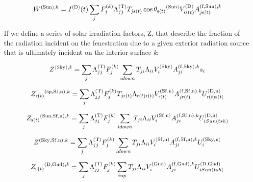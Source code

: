 \begin{equation}
{W^{{\rm{(Sun)}},k}} = {I^{{\rm{(D)}}}}(t)\sum\limits_j {F_j^{{\rm{(}}k{\rm{)}}}\Lambda_{jj}^{{\rm{(T)}}}{T_{j{\rm{ s}}(t)}}\cos {\theta_{{\rm{s(}}t{\rm{)}}}}^{{\rm{(Sun)}}}V_{i{\rm{ s(}}t{\rm{)}}}^{{\rm{(D)}}}A_{j{\rm{ s(}}t{\rm{)}}}^{{\rm{(f, Sun), }}k}}
\end{equation}

If we define a series of solar irradiation factors, Z, that describe the fraction of the radiation incident on the fenestration due to a given exterior radiation source that is ultimately incident on the interior surface \emph{k}:

\begin{equation}
{Z^{{\rm{(Sky), }}k}} = \sum\limits_j {\Lambda_{jj}^{{\rm{(T)}}}F_j^{{\rm{(}}k{\rm{)}}}\sum\limits_{i{\rm{ }}down} {{T_{ji}}{\Lambda_{ii}}V_i^{{\rm{(Sky)}}}A_{ji}^{{\rm{(f, Sky), }}k}{s_i}} }
\label{eq:ZSkykEquation}
\end{equation}

\begin{equation}
{Z_{{\rm{r(}}t{\rm{)}}}}^{{\rm{(sp, Sf, n)}},k} = \sum\limits_j {\Lambda_{jj}^{{\rm{(T)}}}F_j^{{\rm{(}}k{\rm{)}}}{T_{j{\rm{ r(}}t{\rm{)}}}}{\Lambda_{{\rm{ r(}}t{\rm{) r(}}t{\rm{)}}}}V_{{\rm{ r(}}t{\rm{)}}}^{{\rm{(Sf, n)}}}A_{j{\rm{ r(}}t{\rm{)}}}^{{\rm{(f, Sf, n), }}k}U_{{\rm{ r(}}t{\rm{) s(}}t{\rm{)}}}^{{\rm{(D,n)}}}}
\end{equation}

\begin{equation}
{Z_{{\rm{s(}}t{\rm{)}}}}^{{\rm{(Sun, Sf, n)}},k} = \sum\limits_j {\Lambda_{jj}^{{\rm{(T)}}}F_j^{{\rm{(}}k{\rm{)}}}\sum\limits_{i{\rm{ }}down} {{T_{ji}}{\Lambda_{ii}}V_i^{{\rm{(Sf, n)}}}A_{ji}^{{\rm{(f, Sf, n), }}k}U_{i{\rm{ }}Sun(tsh)}^{{\rm{(D,n)}}}} }
\end{equation}

\begin{equation}
{Z^{{\rm{(Sky, Sf, n)}},k}} = \sum\limits_j {\Lambda_{jj}^{{\rm{(T)}}}F_j^{{\rm{(}}k{\rm{)}}}\sum\limits_{i{\rm{ }}down} {{T_{ji}}{\Lambda_{ii}}V_i^{{\rm{(Sf, n)}}}A_{ji}^{{\rm{(f, Sf, n), }}k}U_i^{{\rm{(Sky, n)}}}} }
\end{equation}

\begin{equation}
{Z_{{\rm{s(}}t{\rm{)}}}}^{{\rm{(D, Gnd)}},k} = \sum\limits_j {\Lambda_{jj}^{{\rm{(T)}}}F_j^{{\rm{(}}k{\rm{)}}}\sum\limits_{i{\rm{ }}up} {{T_{ji}}{\Lambda_{ii}}V_i^{{\rm{(Gnd)}}}A_{ji}^{{\rm{(f, Gnd), }}k}U_{i{\rm{ }}Sun(tsh)}^{{\rm{(D, Gnd)}}}} }
\end{equation}

